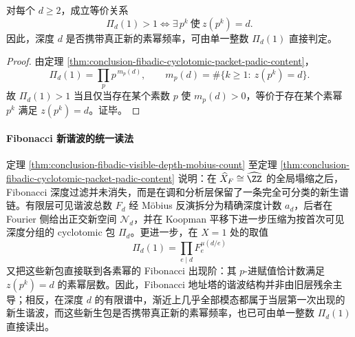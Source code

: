 \begin{corollary}[深度包在 \texorpdfstring{$X=1$}{X=1} 处检测真正的新素幂频率]\label{cor:conclusion-fibadic-cyclotomic-packet-detects-new-prime-power}
对每个 \(d\ge 2\)，成立等价关系
\[
\Pi_d(1)>1
\iff
\exists\,p^k\ \text{使}\ z(p^k)=d.
\]
因此，深度 \(d\) 是否携带真正新的素幂频率，可由单一整数 \(\Pi_d(1)\) 直接判定。
\end{corollary}
\begin{proof}
由定理 \ref{thm:conclusion-fibadic-cyclotomic-packet-padic-content}，
\[
\Pi_d(1)=\prod_p p^{\,m_p(d)},
\qquad
m_p(d)=\#\{k\ge 1:\ z(p^k)=d\}.
\]
故 \(\Pi_d(1)>1\) 当且仅当存在某个素数 \(p\) 使 \(m_p(d)>0\)，等价于存在某个素幂 \(p^k\) 满足 \(z(p^k)=d\)。证毕。
\end{proof}

\paragraph{Fibonacci 新谐波的统一读法}
定理 \ref{thm:conclusion-fibadic-visible-depth-mobius-count} 至定理 \ref{thm:conclusion-fibadic-cyclotomic-packet-padic-content} 说明：在 \(\widehat X_F\cong \widehat{\ZZ}\) 的全局塌缩之后，Fibonacci 深度过滤并未消失，而是在调和分析层保留了一条完全可分类的新生谱链。有限层可见谐波总数 \(F_d\) 经 Möbius 反演拆分为精确深度计数 \(a_d\)，后者在 Fourier 侧给出正交新空间 \(\mathcal N_d\)，并在 Koopman 平移下进一步压缩为按首次可见深度分组的 cyclotomic 包 \(\Pi_d\)。更进一步，在 \(X=1\) 处的取值
\[
\Pi_d(1)=\prod_{e\mid d}F_e^{\mu(d/e)}
\]
又把这些新包直接联到各素幂的 Fibonacci 出现阶：其 \(p\)-进赋值恰计数满足 \(z(p^k)=d\) 的素幂层数。因此，Fibonacci 地址塔的谐波结构并非由旧层残余主导；相反，在深度 \(d\) 的有限谱中，渐近上几乎全部模态都属于当层第一次出现的新生谐波，而这些新生包是否携带真正新的素幂频率，也已可由单一整数 \(\Pi_d(1)\) 直接读出。

\endinput
